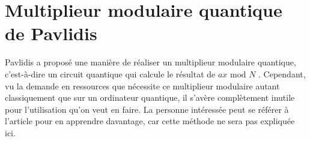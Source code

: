 \section{Multiplieur modulaire quantique de Pavlidis}
Pavlidis a proposé une manière de réaliser un multiplieur modulaire quantique, c'est-à-dire un circuit quantique qui calcule le résultat de $ax \text{ mod } N$ \cite{pavlidis2013fastquantummodularexponentiation}. Cependant, vu la demande en ressources que nécessite ce multiplieur modulaire autant classiquement que sur un ordinateur quantique, il s'avère complètement inutile pour l'utilisation qu'on veut en faire. La personne intéressée peut se référer à l'article pour en apprendre davantage, car cette méthode ne sera pas expliquée ici.